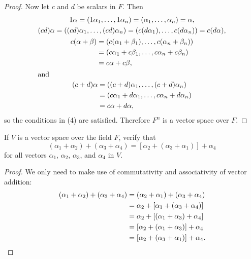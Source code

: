 \begin{proof}
  Now let $c$ and $d$ be scalars in $F$. Then
  \begin{gather*}
    1\alpha
    = (1\alpha_1,\dots,1\alpha_n)
    = (\alpha_1,\dots,\alpha_n) = \alpha, \\
    (cd)\alpha
    = ((cd)\alpha_1, \dots, (cd)\alpha_n)
    = (c(d\alpha_1), \dots, c(d\alpha_n))
    = c(d\alpha), \\
    \begin{split}
      c(\alpha + \beta)
      &= (c(\alpha_1 + \beta_1),\dots,c(\alpha_n + \beta_n)) \\
      &= (c\alpha_1 + c\beta_1,\dots,c\alpha_n + c\beta_n) \\
      &= c\alpha + c\beta,
    \end{split} \\
    \intertext{and}
    \begin{split}
      (c + d)\alpha
      &= ((c + d)\alpha_1,\dots,(c+d)\alpha_n) \\
      &= (c\alpha_1 + d\alpha_1,\dots, c\alpha_n + d\alpha_n) \\
      &= c\alpha + d\alpha,
    \end{split}
  \end{gather*}
  so the conditions in (4) are satisfied. Therefore $F^n$ is a vector
  space over $F$.
\end{proof}

 If $V$ is a vector space over the field $F$, verify that
\begin{equation*}
  (\alpha_1 + \alpha_2) + (\alpha_3 + \alpha_4)
  = [\alpha_2 + (\alpha_3 + \alpha_1)] + \alpha_4
\end{equation*}
for all vectors $\alpha_1$, $\alpha_2$, $\alpha_3$, and $\alpha_4$ in
$V$.
\begin{proof}
  We only need to make use of commutativity and associativity of
  vector addition:
  \begin{align*}
    (\alpha_1 + \alpha_2) + (\alpha_3 + \alpha_4)
    &= (\alpha_2 + \alpha_1) + (\alpha_3 + \alpha_4) \\
    &= \alpha_2 + [\alpha_1 + (\alpha_3 + \alpha_4)] \\
    &= \alpha_2 + [(\alpha_1 + \alpha_3) + \alpha_4] \\
    &= [\alpha_2 + (\alpha_1 + \alpha_3)] + \alpha_4 \\
    &= [\alpha_2 + (\alpha_3 + \alpha_1)] + \alpha_4. \qedhere
  \end{align*}
\end{proof}

